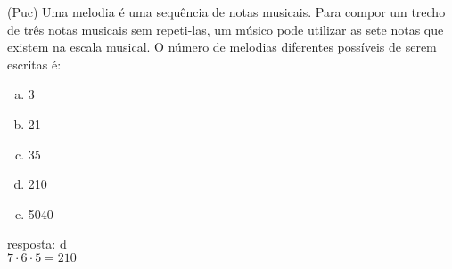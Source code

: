 \begin{ex}
(Puc) Uma melodia é uma sequência de notas musicais. Para compor um trecho de três notas musicais sem repeti-las, um músico pode utilizar as sete notas que existem na escala musical. O número de melodias diferentes possíveis de serem escritas é:
   \begin{enumerate}[(a)]
   \item 3
   \item 21
   \item 35
   \item 210
   \item 5040
   \end{enumerate}
     \begin{sol}
      resposta: d \\
      $7\cdot6\cdot5=210$
     \end{sol}
\end{ex}